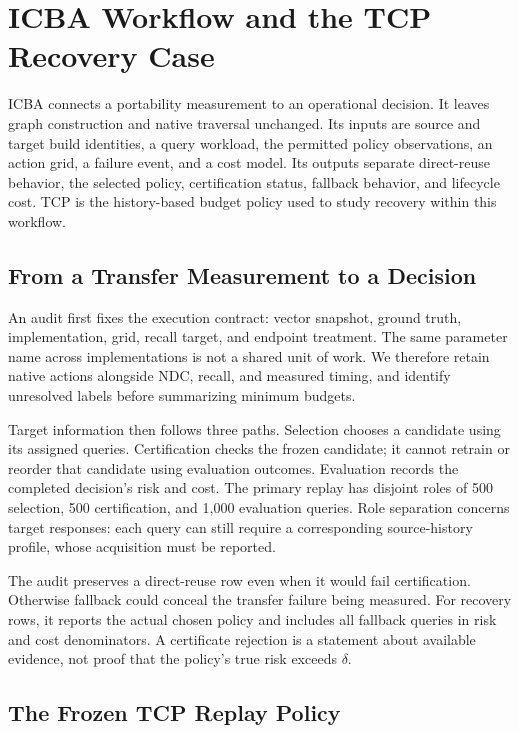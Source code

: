 \section{ICBA Workflow and the TCP Recovery Case}
\label{sec:auditor}

ICBA connects a portability measurement to an operational decision. It leaves graph construction and native traversal unchanged. Its inputs are source and target build identities, a query workload, the permitted policy observations, an action grid, a failure event, and a cost model. Its outputs separate direct-reuse behavior, the selected policy, certification status, fallback behavior, and lifecycle cost. TCP is the history-based budget policy used to study recovery within this workflow.

\subsection{From a Transfer Measurement to a Decision}

An audit first fixes the execution contract: vector snapshot, ground truth, implementation, grid, recall target, and endpoint treatment. The same parameter name across implementations is not a shared unit of work. We therefore retain native actions alongside NDC, recall, and measured timing, and identify unresolved labels before summarizing minimum budgets.

Target information then follows three paths. Selection chooses a candidate using its assigned queries. Certification checks the frozen candidate; it cannot retrain or reorder that candidate using evaluation outcomes. Evaluation records the completed decision's risk and cost. The primary replay has disjoint roles of 500 selection, 500 certification, and 1,000 evaluation queries. Role separation concerns target responses: each query can still require a corresponding source-history profile, whose acquisition must be reported.

The audit preserves a direct-reuse row even when it would fail certification. Otherwise fallback could conceal the transfer failure being measured. For recovery rows, it reports the actual chosen policy and includes all fallback queries in risk and cost denominators. A certificate rejection is a statement about available evidence, not proof that the policy's true risk exceeds $\delta$.

\subsection{The Frozen TCP Replay Policy}
\label{sec:tcp-implementation}

